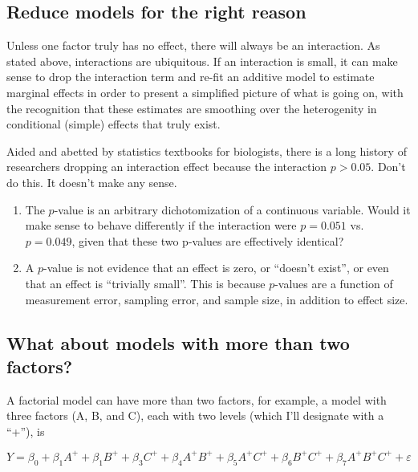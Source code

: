 \documentclass[]{book}
\providecommand{\tightlist}{%
  \setlength{\itemsep}{0pt}\setlength{\parskip}{0pt}}
\begin{document}
\hypertarget{reduce-models-for-the-right-reason}{%
\subsection{Reduce models for the right reason}\label{reduce-models-for-the-right-reason}}

Unless one factor truly has no effect, there will always be an interaction. As stated above, interactions are ubiquitous. If an interaction is small, it can make sense to drop the interaction term and re-fit an additive model to estimate marginal effects in order to present a simplified picture of what is going on, with the recognition that these estimates are smoothing over the heterogenity in conditional (simple) effects that truly exist.

Aided and abetted by statistics textbooks for biologists, there is a long history of researchers dropping an interaction effect because the interaction \(p>0.05\). Don't do this. It doesn't make any sense.

\begin{enumerate}
\def\labelenumi{\arabic{enumi}.}
\tightlist
\item
  The \(p\)-value is an arbitrary dichotomization of a continuous variable. Would it make sense to behave differently if the interaction were \(p=0.051\) vs.~\(p=0.049\), given that these two p-values are effectively identical?
\item
  A \(p\)-value is not evidence that an effect is zero, or ``doesn't exist'', or even that an effect is ``trivially small''. This is because \(p\)-values are a function of measurement error, sampling error, and sample size, in addition to effect size.
\end{enumerate}

\hypertarget{what-about-models-with-more-than-two-factors}{%
\subsection{What about models with more than two factors?}\label{what-about-models-with-more-than-two-factors}}

A factorial model can have more than two factors, for example, a model with three factors (A, B, and C), each with two levels (which I'll designate with a ``+''), is

\begin{equation}
Y = \beta_0 + \beta_1 A^+ + \beta_1 B^+ + \beta_3 C^+ + \beta_4 A^+ B^+ + \beta_5 A^+ C^+ + \beta_6 B^+ C^+ + \beta_7 A^+ B^+ C^+ + \varepsilon
\end{equation}
\end{document}
